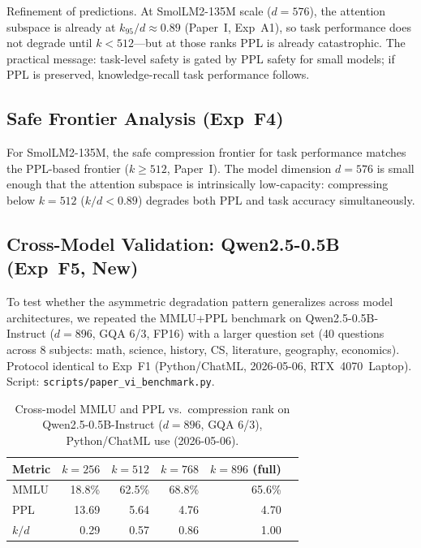 \documentclass[11pt]{article}
\begin{document}
Refinement of predictions.  At SmolLM2-135M scale ($d{=}576$),
the attention subspace is already at $k_{95}/d{\approx}0.89$ (Paper~I,
Exp~A1), so task performance does not degrade until $k{<}512$---but at
those ranks PPL is already catastrophic.  The practical message:
task-level safety is gated by PPL safety for small models; if PPL is
preserved, knowledge-recall task performance follows.

\subsection{Safe Frontier Analysis (Exp~F4)}

For SmolLM2-135M, the safe compression frontier for task performance
matches the PPL-based frontier ($k{\ge}512$, Paper~I).  The model
dimension $d{=}576$ is small enough that the attention subspace is
intrinsically low-capacity: compressing below $k{=}512$ ($k/d{<}0.89$)
degrades both PPL and task accuracy simultaneously.

\subsection{Cross-Model Validation: Qwen2.5-0.5B (Exp~F5, New)}

To test whether the asymmetric degradation pattern generalizes across
model architectures, we repeated the MMLU+PPL benchmark on
Qwen2.5-0.5B-Instruct ($d{=}896$, GQA 6/3, FP16) with a larger
question set (40 questions across 8 subjects: math, science, history,
CS, literature, geography, economics).  Protocol identical to Exp~F1
(Python/ChatML, 2026-05-06, RTX~4070~Laptop).
Script: \texttt{scripts/paper\_vi\_benchmark.py}.

\begin{table}[h]\centering\small
\caption{Cross-model MMLU and PPL vs.\ compression rank on
Qwen2.5-0.5B-Instruct ($d{=}896$, GQA 6/3), Python/ChatML use (2026-05-06).}
\label{tab:f5-qwen}
\begin{tabular}{@{}lrrrrr@{}}
\toprule
Metric  & $k{=}256$ & $k{=}512$ & $k{=}768$ & $k{=}896$ (full) \\
\midrule
MMLU    & 18.8\% & 62.5\% & 68.8\% & 65.6\% \\
PPL     & 13.69 & 5.64  & 4.76  & 4.70 \\
$k/d$   & 0.29  & 0.57  & 0.86  & 1.00 \\
\bottomrule
\end{tabular}
\end{table}
\end{document}
